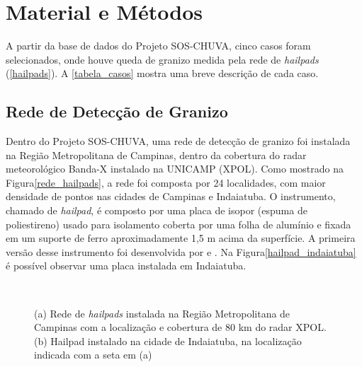 \chapter{Material e Métodos}\label{database}

A partir da base de dados do Projeto SOS-CHUVA, cinco casos foram selecionados, onde houve queda de granizo medida pela rede de \textit{hailpads} (\autoref{hailpads}). A \autoref{tabela_casos} mostra uma breve descrição de cada caso.



\section{Rede de Detecção de Granizo}\label{hailpads}

Dentro do Projeto SOS-CHUVA, uma rede de detecção de granizo foi instalada na Região Metropolitana de Campinas, dentro da cobertura do radar meteorológico Banda-X instalado na UNICAMP (XPOL). Como mostrado na Figura\autoref{rede_hailpads}, a rede foi composta por 24 localidades, com maior densidade de pontos nas cidades de Campinas e Indaiatuba. O instrumento, chamado de \textit{hailpad}, é composto por uma placa de isopor (espuma de poliestireno) usado para isolamento coberta por uma folha de alumínio e fixada em um suporte de ferro aproximadamente 1,5 m acima da superfície. A primeira versão desse instrumento foi desenvolvida por  e . Na Figura\autoref{hailpad_indaiatuba} é possível observar uma placa instalada em Indaiatuba.

\begin{figure}[htb]
	\begin{center}
		\caption{(a) Rede de \textit{hailpads} instalada na Região Metropolitana de Campinas com a localização e cobertura de 80 km do radar XPOL. (b) Hailpad instalado na cidade de Indaiatuba, na localização indicada com a seta em (a)} 
		\label{overview_hailpads}
		\ \
		\\
	\end{center}
\end{figure}

